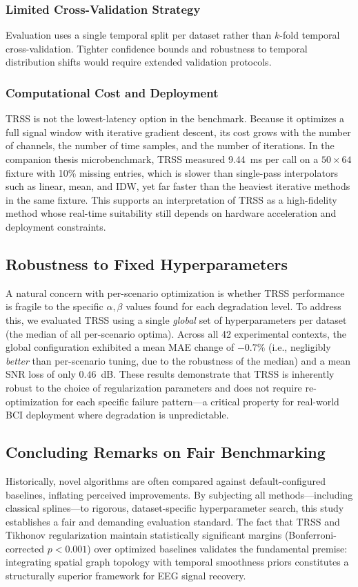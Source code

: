 \subsubsection{Limited Cross-Validation Strategy}
Evaluation uses a single temporal split per dataset rather than $k$-fold temporal cross-validation. Tighter confidence bounds and robustness to temporal distribution shifts would require extended validation protocols.

\subsubsection{Computational Cost and Deployment}
TRSS is not the lowest-latency option in the benchmark. Because it optimizes a full signal window with iterative gradient descent, its cost grows with the number of channels, the number of time samples, and the number of iterations. In the companion thesis microbenchmark, TRSS measured 9.44~ms per call on a $50\times64$ fixture with 10\% missing entries, which is slower than single-pass interpolators such as linear, mean, and IDW, yet far faster than the heaviest iterative methods in the same fixture. This supports an interpretation of TRSS as a high-fidelity method whose real-time suitability still depends on hardware acceleration and deployment constraints.

\subsection{Robustness to Fixed Hyperparameters}
A natural concern with per-scenario optimization is whether TRSS performance is fragile to the specific $\alpha, \beta$ values found for each degradation level. To address this, we evaluated TRSS using a single \emph{global} set of hyperparameters per dataset (the median of all per-scenario optima). Across all 42 experimental contexts, the global configuration exhibited a mean MAE change of $-0.7\%$ (i.e., negligibly \emph{better} than per-scenario tuning, due to the robustness of the median) and a mean SNR loss of only $0.46$~dB. These results demonstrate that TRSS is inherently robust to the choice of regularization parameters and does not require re-optimization for each specific failure pattern---a critical property for real-world BCI deployment where degradation is unpredictable.

\subsection{Concluding Remarks on Fair Benchmarking}
Historically, novel algorithms are often compared against default-configured baselines, inflating perceived improvements. By subjecting all methods---including classical splines---to rigorous, dataset-specific hyperparameter search, this study establishes a fair and demanding evaluation standard. The fact that TRSS and Tikhonov regularization maintain statistically significant margins (Bonferroni-corrected $p < 0.001$) over optimized baselines validates the fundamental premise: integrating spatial graph topology with temporal smoothness priors constitutes a structurally superior framework for EEG signal recovery.
